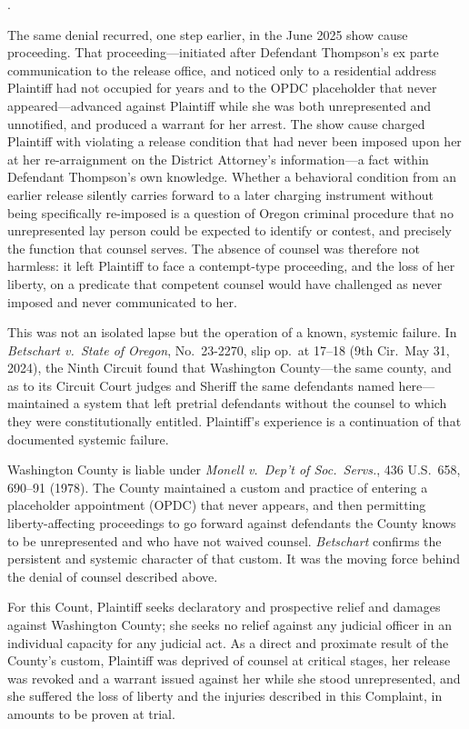 \documentclass[12pt,letterpaper]{article}
\newcounter{complaintpara}
\newenvironment{paras}{%
	\begin{list}{\arabic{complaintpara}.}{%
			\setlength{\leftmargin}{0.5in}%
			\setlength{\labelwidth}{0.4in}%
			\setlength{\labelsep}{0.1in}%
			\setlength{\itemsep}{0pt}%
			\setlength{\parsep}{0pt}%
			\setlength{\topsep}{6pt}%
		}%
	}{%
	\end{list}%
}
\begin{document}
\begin{paras}
		\item The same denial recurred, one step earlier, in the June 2025 show cause proceeding. That proceeding---initiated after Defendant Thompson's ex parte communication to the release office, and noticed only to a residential address Plaintiff had not occupied for years and to the OPDC placeholder that never appeared---advanced against Plaintiff while she was both unrepresented and unnotified, and produced a warrant for her arrest. The show cause charged Plaintiff with violating a release condition that had never been imposed upon her at her re-arraignment on the District Attorney's information---a fact within Defendant Thompson's own knowledge. Whether a behavioral condition from an earlier release silently carries forward to a later charging instrument without being specifically re-imposed is a question of Oregon criminal procedure that no unrepresented lay person could be expected to identify or contest, and precisely the function that counsel serves. The absence of counsel was therefore not harmless: it left Plaintiff to face a contempt-type proceeding, and the loss of her liberty, on a predicate that competent counsel would have challenged as never imposed and never communicated to her.
		
		\item This was not an isolated lapse but the operation of a known, systemic failure. In \textit{Betschart v.\ State of Oregon}, No.\ 23-2270, slip op.\ at 17--18 (9th Cir.\ May 31, 2024), the Ninth Circuit found that Washington County---the same county, and as to its Circuit Court judges and Sheriff the same defendants named here---maintained a system that left pretrial defendants without the counsel to which they were constitutionally entitled. Plaintiff's experience is a continuation of that documented systemic failure.
		
		\item Washington County is liable under \textit{Monell v.\ Dep't of Soc.\ Servs.}, 436 U.S.\ 658, 690--91 (1978). The County maintained a custom and practice of entering a placeholder appointment (OPDC) that never appears, and then permitting liberty-affecting proceedings to go forward against defendants the County knows to be unrepresented and who have not waived counsel. \textit{Betschart} confirms the persistent and systemic character of that custom. It was the moving force behind the denial of counsel described above.
		
		\item For this Count, Plaintiff seeks declaratory and prospective relief and damages against Washington County; she seeks no relief against any judicial officer in an individual capacity for any judicial act. As a direct and proximate result of the County's custom, Plaintiff was deprived of counsel at critical stages, her release was revoked and a warrant issued against her while she stood unrepresented, and she suffered the loss of liberty and the injuries described in this Complaint, in amounts to be proven at trial.
	\end{paras}
\end{document}

